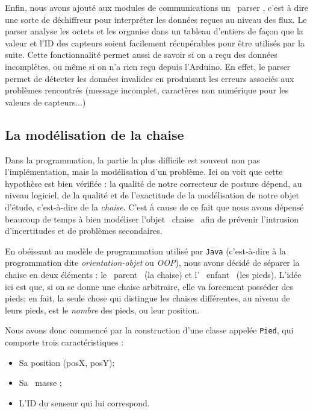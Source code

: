 \documentclass{polytech/polytech}
\begin{document}
Enfin, nous avons ajouté aux modules de communications un \guillemotleft\ parser \guillemotright , c'est à dire une sorte de déchiffreur pour interpréter les données reçues au niveau des flux.
 Le parser analyse les octets et les organise dans un tableau d'entiers de façon que la valeur et l'ID des capteurs soient facilement récupérables pour être utilisés par la suite.
Cette fonctionnalité permet aussi de savoir si on a reçu des données incomplètes, ou même si on n'a rien reçu depuis l'Arduino. En effet, le parser permet de détecter les données invalides en produisant les erreurs associés aux problèmes rencontrés (message incomplet, caractères non numérique pour les valeurs de capteurs...)


\subsection{La modélisation de la chaise}
\label{subsec:model_chaise}
Dans la programmation, la partie la plus difficile est souvent non pas l'implémentation, mais la modélisation d'un problème. Ici on voit que cette hypothèse est bien vérifiée : la qualité de notre correcteur de posture dépend, au niveau logiciel, de la qualité et de l'exactitude de la modélisation de notre objet d'étude, c'est-à-dire de la \textit{chaise}. C'est à cause de ce fait que nous avons dépensé beaucoup de temps à bien modéliser l'objet \guillemotleft\ chaise \guillemotright\ afin de prévenir l’intrusion d’incertitudes et de problèmes secondaires.

En obéissant au modèle de programmation utilisé par \texttt{Java} (c'est-à-dire à la programmation dite \textit{orientation-objet} ou \textit{OOP}), nous avons décidé de séparer la chaise en deux éléments : le \guillemotleft\ parent \guillemotright\ (la chaise) et l' \guillemotleft\ enfant \guillemotright\ (les pieds). L'idée ici est que, si on se donne une chaise arbitraire, elle va forcement posséder des pieds; en fait, la seule chose qui distingue les chaises différentes, au niveau de leurs pieds, est le \textit{nombre} des pieds, ou leur position.

Nous avons donc commencé par la construction d'une classe appelée \texttt{Pied}, qui comporte trois caractéristiques :
\begin{itemize}
\item Sa position (posX, posY);
\item Sa \guillemotleft\ masse \guillemotright ;
\item L’ID du senseur qui lui correspond.
\end{itemize}
\end{document}
